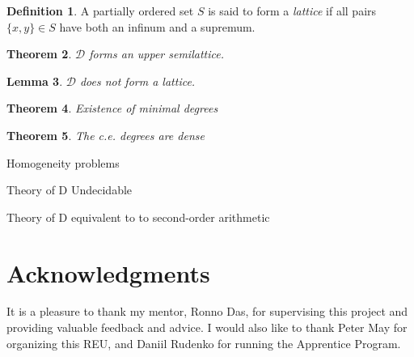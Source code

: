 \documentclass[psamsfonts]{amsart}
\newtheorem{thm}{Theorem}[section]
\newtheorem{lem}[thm]{Lemma}
\theoremstyle{definition}
\newtheorem{defn}[thm]{Definition}
\theoremstyle{remark}
\numberwithin{equation}{section}
\begin{document}
\begin{defn}
  A partially ordered set $S$ is said to form a \emph{lattice} if all pairs
  $\{x,y\}\in S$ have both an infinum and a supremum.
\end{defn}


\begin{thm}
  $\mathcal{D}$ forms an upper semilattice.
  \cite{kleene54_upper_semi_lattic_degrees_recur_unsol}
\end{thm}
\begin{lem}
 $ \mathcal{D}$ does not form a lattice.
  \cite{kleene54_upper_semi_lattic_degrees_recur_unsol}
\end{lem}

\begin{thm}
  Existence of minimal degrees
  \cite{spector56_degrees_recur_unsol}
  \cite{shoenfield66_theor_minim_degrees}
\end{thm}

\begin{thm}
  The c.e. degrees are dense
  \cite{sacks64:_recur_enumer_degrees_dense}
\end{thm}

Homogeneity problems

Theory of D Undecidable


Theory of D equivalent to to second-order arithmetic \cite{simpson77:_first_order_theor_degrees_recur_unsol}





\section*{Acknowledgments}
It is a pleasure to thank my mentor, Ronno Das, for supervising this project and
providing valuable feedback and advice. I would also like to thank Peter May for
organizing this REU, and Daniil Rudenko for running the Apprentice Program.

\printbibliography
\end{document}
